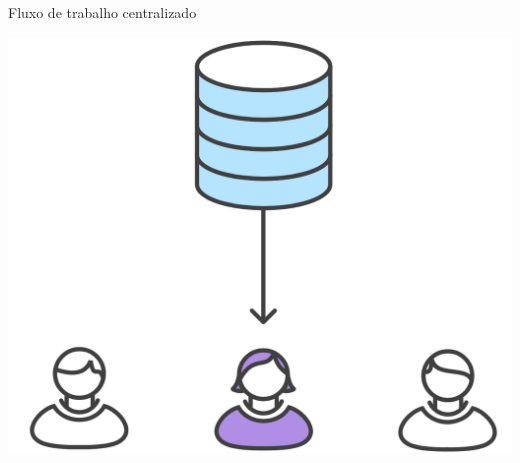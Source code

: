 \documentclass[aspectratio=169]{beamer} %
\begin{document}
\begin{SliTC}{Fluxo de trabalho centralizado}
\begin{itemize}


    \begin{itemize}
    
    
    \end{itemize}

\end{itemize}

\begin{center}
    \includegraphics[scale=.2]{img/git-fluxo-centralizado-conflito6.png}
\end{center}


\end{SliTC}
\end{document}
